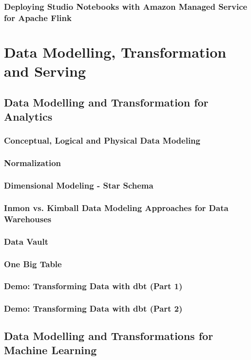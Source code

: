 \subsubsection{Deploying Studio Notebooks with Amazon Managed Service for Apache Flink}

\section{Data Modelling, Transformation and Serving}
\subsection{Data Modelling and Transformation for Analytics}
\subsubsection{Conceptual, Logical and Physical Data Modeling}
\subsubsection{Normalization}
\subsubsection{Dimensional Modeling - Star Schema}
\subsubsection{Inmon vs. Kimball Data Modeling Approaches for Data Warehouses}
\subsubsection{Data Vault}
\subsubsection{One Big Table}
\subsubsection{Demo: Transforming Data with dbt (Part 1)}
\subsubsection{Demo: Transforming Data with dbt (Part 2)}

\subsection{Data Modelling and Transformations for Machine Learning}
